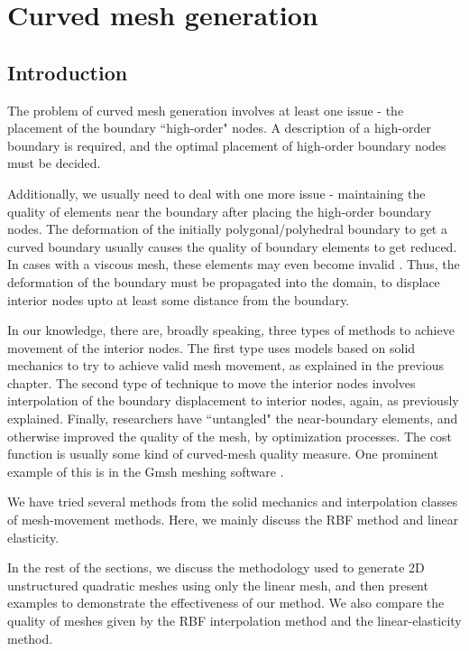 \chapter{Curved mesh generation}
\section{Introduction}

The problem of curved mesh generation involves at least one issue - the placement of the boundary ``high-order" nodes. A description of a high-order boundary is required, and the optimal placement of high-order boundary nodes must be decided.

Additionally, we usually need to deal with one more issue - maintaining the quality of elements near the boundary after placing the high-order boundary nodes. The deformation of the initially polygonal/polyhedral boundary to get a curved boundary usually causes the quality of boundary elements to get reduced. In cases with a viscous mesh, these elements may even become invalid \cite{curve:persson, gmsh:untangling}. Thus, the deformation of the boundary must be propagated into the domain, to displace interior nodes upto at least some distance from the boundary.

In our knowledge, there are, broadly speaking, three types of methods to achieve movement of the interior nodes. The first type uses models based on solid mechanics to try to achieve valid mesh movement, as explained in the previous chapter. The second type of technique to move the interior nodes involves interpolation of the boundary displacement to interior nodes, again, as previously explained. Finally, researchers have ``untangled" the near-boundary elements, and otherwise improved the quality of the mesh, by optimization processes. The cost function is usually some kind of curved-mesh quality measure. One prominent example of this is in the Gmsh meshing software \cite{gmsh:untangling}.

We have tried several methods from the solid mechanics and interpolation classes of mesh-movement methods. Here, we mainly discuss the RBF method and linear elasticity.

In the rest of the sections, we discuss the methodology used to generate 2D unstructured quadratic meshes using only the linear mesh, and then present examples to demonstrate the effectiveness of our method. We also compare the quality of meshes given by the RBF interpolation method and the linear-elasticity method.


